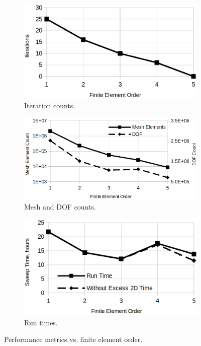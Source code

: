 \documentclass[titlepage]{article}
\renewcommand\_{\textunderscore\linebreak[1]}
\begin{document}
\begin{figure}[H]
  \centering
  \begin{subfigure}[t]{0.38\textwidth}
     \includegraphics[width=1\linewidth]{../regression/OpenParEM3D/microstrip/filter_study/screenshots/filter_iterations}
     \caption{Iteration counts.}
  \end{subfigure}
  \begin{subfigure}[t]{0.43\textwidth}
     \includegraphics[width=1\linewidth]{../regression/OpenParEM3D/microstrip/filter_study/screenshots/filter_counts}
     \caption{Mesh and DOF counts.}
  \end{subfigure}
  \par\bigskip
  \begin{subfigure}[t]{0.35\textwidth}
     \includegraphics[width=1\linewidth]{../regression/OpenParEM3D/microstrip/filter_study/screenshots/filter_run_times}
     \caption{Run times.}
  \end{subfigure}
  \caption{Performance metrics vs. finite element order.}
  \label{fig:filter_run_times}
\end{figure}
\end{document}
